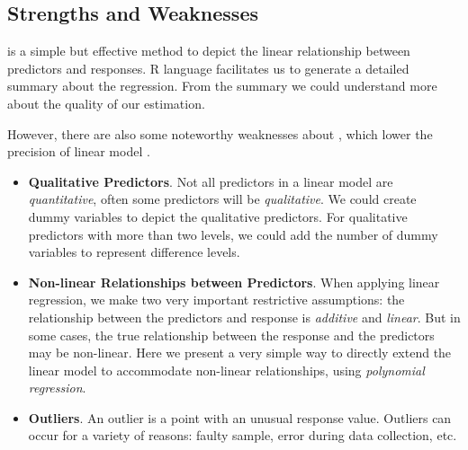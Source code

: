 \subsection{Strengths and Weaknesses}

{\MLR} is a simple but effective method to depict the linear relationship between predictors and responses. R language facilitates us to generate a detailed summary about the regression. From the summary we could understand more about the quality of our estimation.

However, there are also some noteworthy weaknesses about {\mlr}, which lower the precision of linear model .
\begin{itemize}
  \item \textbf{Qualitative Predictors}. Not all predictors in a linear model are \emph{quantitative}, often some predictors will be \emph{qualitative}. We could create dummy variables to depict the qualitative predictors. For qualitative predictors with more than two levels, we could add the number of dummy variables to represent difference levels.
  \item \textbf{Non-linear Relationships between Predictors}. When applying linear regression, we make two very important restrictive assumptions: the relationship between the predictors and response is \emph{additive} and \emph{linear}.
      But in some cases, the true relationship between the response and the predictors may be non-linear. Here we present a very simple way to directly extend the linear model to accommodate non-linear relationships, using \emph{polynomial regression}.
  \item \textbf{Outliers}. An outlier is a point with an unusual response value. Outliers can occur for a variety of reasons: faulty sample, error during data collection, etc.
\end{itemize}
